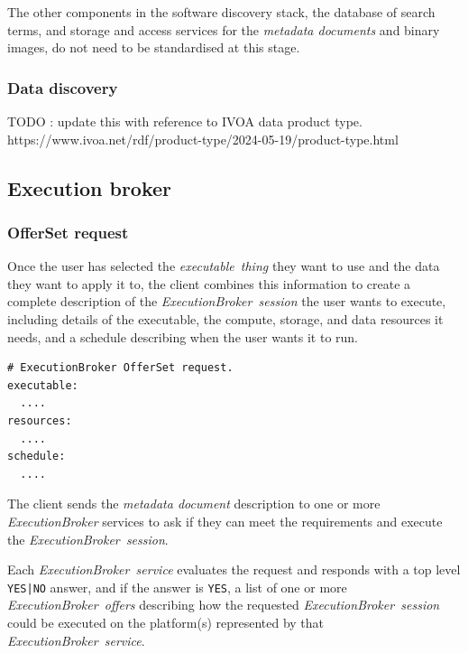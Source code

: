 \documentclass[11pt,a4paper]{ivoa}
\newcommand{\ivoa} {IVOA}
\newcommand{\execbrokerclass} {\textit{ExecutionBroker}}
\newcommand{\execbrokerservice}[1] {\textit{ExecutionBroker~service#1}}
\newcommand{\execoffer}[1] {\textit{ExecutionBroker~offer#1}}
\newcommand{\execsession}[1] {\textit{ExecutionBroker~session#1}}
\newcommand{\executablething}[1] {\textit{executable~thing#1}}
\newcommand{\metadoc} [1]{\textit{metadata document#1}}
\newcommand{\codeword}[1] {\texttt{#1}}
\begin{document}
The other components in the software discovery stack, the database of search terms, and
storage and access services for the \metadoc{s} and binary images, do not need to be
standardised at this stage.

\subsubsection{Data discovery}
\label{data-discovery}

TODO : update this with reference to \ivoa{} data product type.
https://www.ivoa.net/rdf/product-type/2024-05-19/product-type.html

\subsection{Execution broker}
\label{execution-broker-intro}

\subsubsection{OfferSet request}
\label{offerset-request}

Once the user has selected the \executablething{} they want to use and the
data they want to apply it to, the client combines this information to create a
complete description of the \execsession{} the user wants to execute, including
details of the executable, the compute, storage, and data resources it needs,
and a schedule describing when the user wants it to run.

\begin{lstlisting}[]
# ExecutionBroker OfferSet request.
executable:
  ....
resources:
  ....
schedule:
  ....
\end{lstlisting}

The client sends the \metadoc{} description to one or more \execbrokerclass{}
services to ask if they can meet the requirements and execute the \execsession{}.

Each \execbrokerservice{} evaluates the request and responds with a top level
\codeword{YES|NO} answer, and if
the answer is \codeword{YES}, a list of one or more \execoffer{s} describing how
the requested \execsession{} could be executed on the platform(s) represented by
that \execbrokerservice{}.

\end{document}
